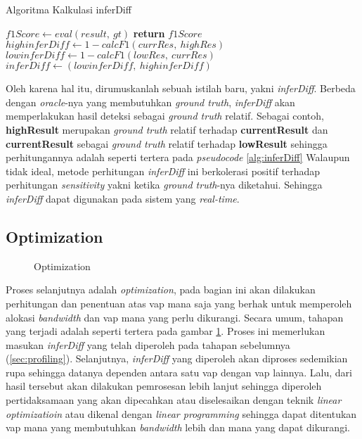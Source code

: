         \begin{algorithm}[tbh]
        \caption{Algoritma Kalkulasi inferDiff}\label{alg:inferDiff}
        \begin{algorithmic}[1]
            \State $f1Score \gets eval(result,\ gt)$
            \State \textbf{return} $f1Score$
        \EndFunction
        \State $highinferDiff \gets 1 - calcF1(currRes,\ highRes)$
        \State $lowinferDiff \gets 1 - calcF1(lowRes,\ currRes)$
        \State $inferDiff \gets (lowinferDiff,\ highinferDiff)$
        \EndProcedure
        \end{algorithmic}
        \end{algorithm}

        Oleh karena hal itu, dirumuskanlah sebuah istilah baru, yakni \textit{inferDiff}.
        Berbeda dengan \textit{oracle}-nya yang membutuhkan \textit{ground truth}, \textit{inferDiff} akan memperlakukan hasil deteksi sebagai \textit{ground truth} relatif. Sebagai contoh, \textbf{highResult} merupakan \textit{ground truth} relatif terhadap \textbf{currentResult}
        dan \textbf{currentResult} sebagai \textit{ground truth} relatif terhadap \textbf{lowResult} sehingga perhitungannya adalah seperti tertera pada \textit{pseudocode} \ref{alg:inferDiff}
        Walaupun tidak ideal, metode perhitungan \textit{inferDiff} ini berkolerasi positif terhadap perhitungan \textit{sensitivity} yakni ketika \textit{ground truth}-nya diketahui. 
        Sehingga \textit{inferDiff} dapat digunakan pada sistem yang \textit{real-time}.


    \subsection{Optimization}

        \begin{figure}[tbh]
            \centering
            
            \caption{Optimization}\label{fig:optimization}
        \end{figure} 

        Proses selanjutnya adalah \textit{optimization}, pada bagian ini akan dilakukan perhitungan dan penentuan atas \gls{vap} mana saja yang berhak untuk 
        memperoleh alokasi \textit{bandwidth} dan \gls{vap} mana yang perlu dikurangi. Secara umum, tahapan yang terjadi adalah seperti tertera pada gambar \ref{fig:optimization}. 
        Proses ini memerlukan masukan \textit{inferDiff} yang telah diperoleh pada tahapan sebelumnya (\ref{sec:profiling}). 
        Selanjutnya, \textit{inferDiff} yang diperoleh akan diproses sedemikian rupa sehingga datanya 
        dependen antara satu \gls{vap} dengan \gls{vap} lainnya. Lalu, dari hasil tersebut akan dilakukan pemrosesan lebih lanjut sehingga diperoleh
        pertidaksamaan yang akan dipecahkan atau diselesaikan dengan teknik \textit{linear optimizatioin} atau dikenal dengan \textit{linear programming} sehingga dapat ditentukan \gls{vap} mana yang membutuhkan \textit{bandwidth} lebih dan mana yang dapat dikurangi.

